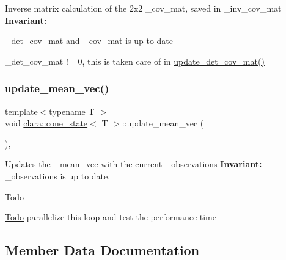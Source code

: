 Inverse matrix calculation of the 2x2 {\ttfamily \+\_\+cov\+\_\+mat}, saved in {\ttfamily \+\_\+inv\+\_\+cov\+\_\+mat} {\bfseries Invariant\+:} 


\begin{DoxyItemize}
\item {\ttfamily \+\_\+det\+\_\+cov\+\_\+mat} and {\ttfamily \+\_\+cov\+\_\+mat} is up to date
\item {\ttfamily \+\_\+det\+\_\+cov\+\_\+mat} != 0, this is taken care of in {\ttfamily \hyperlink{classclara_1_1cone__state_ac04710abc3eba0e3688c70eaeab3f2ce}{update\+\_\+det\+\_\+cov\+\_\+mat()}} 
\end{DoxyItemize}\mbox{\label{classclara_1_1cone__state_ada683dbedcee79d84db8255ee5e71e6e}} 
\subsubsection{\texorpdfstring{update\+\_\+mean\+\_\+vec()}{update\_mean\_vec()}}
{\footnotesize\ttfamily template$<$typename T $>$ \\
void \hyperlink{classclara_1_1cone__state}{clara\+::cone\+\_\+state}$<$ T $>$\+::update\+\_\+mean\+\_\+vec (\begin{DoxyParamCaption}{ }\end{DoxyParamCaption})\hspace{0.3cm}{\ttfamily [inline]}, {\ttfamily [private]}}



Updates the {\ttfamily \+\_\+mean\+\_\+vec} with the current {\ttfamily \+\_\+observations} {\bfseries Invariant\+:} {\ttfamily \+\_\+observations} is up to date. 

\begin{DoxyRefDesc}{Todo}
\item[\hyperlink{todo__todo000004}{Todo}]parallelize this loop and test the performance time \end{DoxyRefDesc}


\subsection{Member Data Documentation}
\mbox{\label{classclara_1_1cone__state_a2a5e7dc2078a6d5ef80b1bac25354e2f}} 
